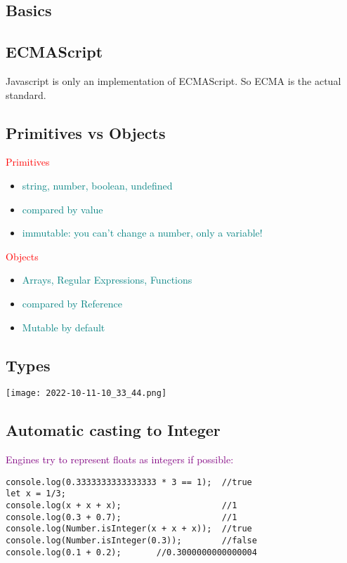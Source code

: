 \documentclass[main.tex,fontsize=6pt,paper=a4,paper=landscape,DIV=calc,]{scrartcl}
\begin{document}
\begin{multicols*}{4}

\section{Basics}

\subsection{ECMAScript} 
Javascript is only an implementation of ECMAScript. So ECMA is the actual standard.
 
\subsection{Primitives vs Objects}  
\textcolor{red}{Primitives}

\begin{itemize}
  \item \textcolor{teal}{string, number, boolean, undefined}
  \item \textcolor{teal}{compared by value}
  \item \textcolor{teal}{immutable: you can't change a number, only a variable!}
\end{itemize}
\vspace{2mm}
\textcolor{red}{Objects}
\begin{itemize}
  \item \textcolor{teal}{Arrays, Regular Expressions, Functions}
  \item \textcolor{teal}{compared by Reference}
  \item \textcolor{teal}{Mutable by default}
\end{itemize}


\subsection{Types} 
\texttt{[image: 2022-10-11-10\_33\_44.png]}

\subsection{Automatic casting to Integer}
\textcolor{purple}{Engines try to represent floats as integers if possible:}
\vspace{-2mm}
\begin{lstlisting}
console.log(0.3333333333333333 * 3 == 1);  //true
let x = 1/3;                               
console.log(x + x + x);                    //1
console.log(0.3 + 0.7);                    //1
console.log(Number.isInteger(x + x + x));  //true
console.log(Number.isInteger(0.3));        //false
console.log(0.1 + 0.2);       //0.3000000000000004


\end{lstlisting}
\end{multicols*}
\end{document}
